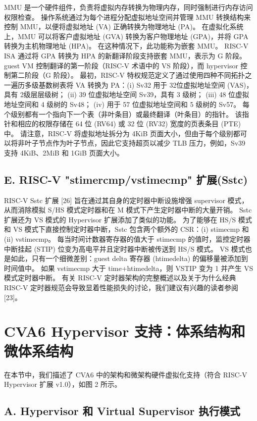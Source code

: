MMU 是一个硬件组件，负责将虚拟内存转换为物理内存，同时强制进行内存访问权限检查。 操作系统通过为每个进程分配虚拟地址空间并管理 MMU 转换结构来控制 MMU，以便将虚拟地址 (VA) 正确转换为物理地址 (PA)。 在虚拟化系统上，MMU 可以将客户虚拟地址 (GVA) 转换为客户物理地址 (GPA)，并将 GPA 转换为主机物理地址 (HPA)。 在这种情况下，此功能称为嵌套 MMU。 RISC-V ISA 通过将 GPA 转换为 HPA 的新翻译阶段支持嵌套 MMU，表示为 G 阶段。 guest VM 控制翻译的第一阶段（RISC-V 术语中的 VS 阶段），而 hypervisor 控制第二阶段（G 阶段）。 最初，RISC-V 特权规范定义了通过使用四种不同拓扑之一遍历多级基数树表将 VA 转换为 PA：(i) Sv32 用于 32位虚拟地址空间 (VAS)，具有 2级层层级树； (ii) 39 位虚拟地址空间 Sv39，具有 3 级树； (iii) 48 位虚拟地址空间和 4 级树的 Sv48； (iv) 用于 57 位虚拟地址空间和 5 级树的 Sv57。 每个级别都有一个指向下一个表（非叶条目）或最终翻译（叶条目）的指针。 该指针和相应的权限存储在 64 位 (RV64) 或 32 位 (RV32) 宽度的页表条目 (PTE) 中。 请注意，RISC-V 将虚拟地址拆分为 4KiB 页面大小，但由于每个级别都可以将非叶子节点作为叶子节点，因此它支持超页以减少 TLB 压力，例如，Sv39 支持 4KiB、2MiB 和 1GiB 页面大小。

\subsection*{E. RISC-V "stimercmp/vstimecmp" 扩展(Sstc)}

RISC-V Sstc 扩展 [26] 旨在通过其自身的定时器中断设施增强 supervisor 模式，从而消除模拟 S/HS 模式定时器和在 M 模式下产生定时器中断的大量开销。 Sstc 扩展还为 VS 模式的 Hypervisor 扩展添加了类似的功能。 为了能够在 HS/S 模式和 VS 模式下直接控制定时器中断，Sstc 包含两个额外的 CSR：(i) stimecmp 和 (ii) vstimecmp。 每当时间计数器寄存器的值大于 stimecmp 的值时，监控定时器中断挂起 (STIP) 位变为高电平并且定时器中断被传送到 HS/S 模式。 VS 模式也是如此，只有一个细微差别：guest delta 寄存器 (htimedelta) 的偏移量被添加到时间值中。 如果 vstimecmp 大于 time+htimedelta，则 VSTIP 变为 1 并产生 VS 模式定时器中断。 有关 RISC-V 定时器架构的完整概述以及关于为什么经典 RISC-V 定时器规范会导致显着性能损失的讨论，我们建议有兴趣的读者参阅 [23]。

\section*{CVA6 Hypervisor 支持：体系结构和微体系结构}

在本节中，我们描述了 CVA6 中的架构和微架构硬件虚拟化支持（符合 RISC-V Hypervisor 扩展 v1.0），如图 2 所示。

\subsection*{A. Hypervisor 和 Virtual Supervisor 执行模式}

